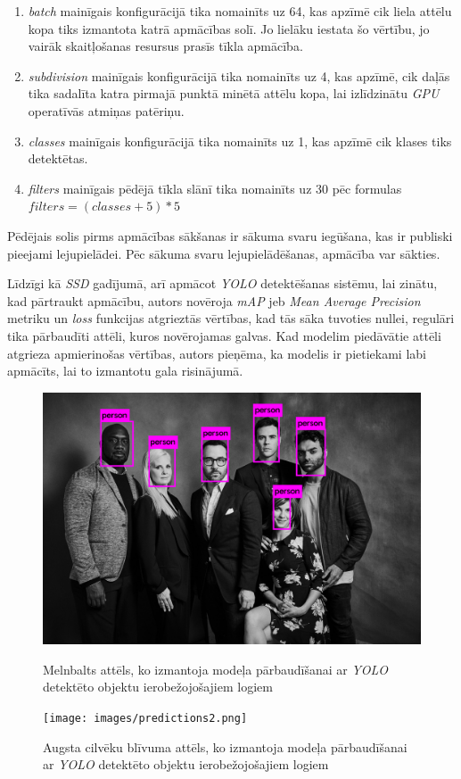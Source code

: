 \begin{enumerate}
	\item \textit{batch} mainīgais konfigurācijā tika nomainīts uz 64, kas apzīmē cik liela attēlu kopa tiks izmantota katrā apmācības solī. Jo lielāku iestata šo vērtību, jo vairāk skaitļošanas resursus prasīs tīkla apmācība.
	\item \textit{subdivision} mainīgais konfigurācijā tika nomainīts uz 4, kas apzīmē, cik daļās tika sadalīta katra pirmajā punktā minētā attēlu kopa, lai izlīdzinātu \textit{GPU} operatīvās atmiņas patēriņu.
	\item \textit{classes} mainīgais konfigurācijā tika nomainīts uz 1, kas apzīmē cik klases tiks detektētas.
	\item \textit{filters} mainīgais pēdējā tīkla slānī tika nomainīts uz 30 pēc formulas $filters=(classes + 5)*5$
\end{enumerate}

Pēdējais solis pirms apmācības sākšanas ir sākuma svaru iegūšana, kas ir publiski pieejami lejupielādei. Pēc sākuma svaru lejupielādēšanas, apmācība var sākties. 

Līdzīgi kā \textit{SSD} gadījumā, arī apmācot \textit{YOLO} detektēšanas sistēmu, lai zinātu, kad pārtraukt apmācību, autors novēroja \textit{mAP} jeb \textit{Mean Average Precision} metriku un \textit{loss} funkcijas atgrieztās vērtības, kad tās sāka tuvoties nullei, regulāri tika pārbaudīti attēli, kuros novērojamas galvas. Kad modelim piedāvātie attēli atgrieza apmierinošas vērtības, autors pieņēma, ka modelis ir pietiekami labi apmācīts, lai to izmantotu gala risinājumā.

\begin{figure}[!htb]
	\includegraphics[width=\linewidth]{images/predictions.png}
	\caption{Melnbalts attēls, ko izmantoja modeļa pārbaudīšanai ar \textit{YOLO} detektēto objektu ierobežojošajiem logiem}
	\endminipage\hfill
	\texttt{[image: images/predictions2.png]}
	\caption{Augsta cilvēku blīvuma attēls, ko izmantoja modeļa pārbaudīšanai ar \textit{YOLO} detektēto objektu ierobežojošajiem logiem}
	\endminipage
\end{figure}

